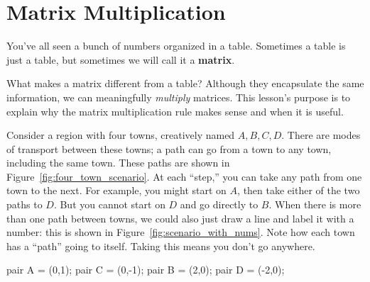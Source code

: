 \documentclass[../gatm.tex]{subfiles}
\begin{document}
\section{Matrix Multiplication}

\newcommand{\indsize}{\scriptsize}
\newcommand{\colind}[2]{\displaystyle\smash{\mathop{#1}^{\raisebox{.5\normalbaselineskip}{$#2$}}}}
\newcommand{\rowind}[1]{\mbox{$#1$}}

You've all seen a bunch of numbers organized in a table. Sometimes a table is just a table, but sometimes we will call it a \textbf{matrix}.

What makes a matrix different from a table? Although they encapsulate the same information, we can meaningfully \textit{multiply} matrices. This lesson's purpose is to explain why the matrix multiplication rule makes sense and when it is useful.

Consider a region with four towns, creatively named $A,B,C,D$. There are modes of transport between these towns; a path can go from a town to any town, including the same town. These paths are shown in Figure~\ref{fig:four_town_scenario}. At each ``step,'' you can take any path from one town to the next. For example, you might start on $A$, then take either of the two paths to $D$. But you cannot start on $D$ and go directly to $B$. When there is more than one path between towns, we could also just draw a line and label it with a number: this is shown in Figure~\ref{fig:scenario_with_nums}. Note how each town has a ``path'' going to itself. Taking this means you don't go anywhere.

\begin{asydef}
pair A = (0,1);
pair C = (0,-1);
pair B = (2,0);
pair D = (-2,0);
\end{asydef}
\end{document}
